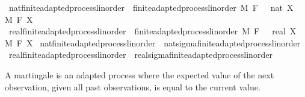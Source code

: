 \begin{isabellebody}
\isanewline
{}\isamarkupfalse%
\ nat{\isacharunderscore}{\kern0pt}finite{\isacharunderscore}{\kern0pt}adapted{\isacharunderscore}{\kern0pt}process{\isacharunderscore}{\kern0pt}linorder\ {\isacharequal}{\kern0pt}\ finite{\isacharunderscore}{\kern0pt}adapted{\isacharunderscore}{\kern0pt}process{\isacharunderscore}{\kern0pt}linorder\ M\ F\ {\isachardoublequoteopen}{}\ {\isacharcolon}{\kern0pt}{\isacharcolon}{\kern0pt}\ nat{\isachardoublequoteclose}\ X\ \ M\ F\ X\isanewline
{}\isamarkupfalse%
\ real{\isacharunderscore}{\kern0pt}finite{\isacharunderscore}{\kern0pt}adapted{\isacharunderscore}{\kern0pt}process{\isacharunderscore}{\kern0pt}linorder\ {\isacharequal}{\kern0pt}\ finite{\isacharunderscore}{\kern0pt}adapted{\isacharunderscore}{\kern0pt}process{\isacharunderscore}{\kern0pt}linorder\ M\ F\ {\isachardoublequoteopen}{}\ {\isacharcolon}{\kern0pt}{\isacharcolon}{\kern0pt}\ real{\isachardoublequoteclose}\ X\ \ M\ F\ X\isanewline
\isanewline
{}\isamarkupfalse%
\ nat{\isacharunderscore}{\kern0pt}finite{\isacharunderscore}{\kern0pt}adapted{\isacharunderscore}{\kern0pt}process{\isacharunderscore}{\kern0pt}linorder\ {\isasymsubseteq}\ nat{\isacharunderscore}{\kern0pt}sigma{\isacharunderscore}{\kern0pt}finite{\isacharunderscore}{\kern0pt}adapted{\isacharunderscore}{\kern0pt}process{\isacharunderscore}{\kern0pt}linorder%
\isadelimproof
\ %
\endisadelimproof
%
\isatagproof
\isacommand{{\isachardot}{\kern0pt}{\isachardot}{\kern0pt}}\isamarkupfalse%
%
\endisatagproof
{\isafoldproof}%
%
\isadelimproof
%
\endisadelimproof
\isanewline
{}\isamarkupfalse%
\ real{\isacharunderscore}{\kern0pt}finite{\isacharunderscore}{\kern0pt}adapted{\isacharunderscore}{\kern0pt}process{\isacharunderscore}{\kern0pt}linorder\ {\isasymsubseteq}\ real{\isacharunderscore}{\kern0pt}sigma{\isacharunderscore}{\kern0pt}finite{\isacharunderscore}{\kern0pt}adapted{\isacharunderscore}{\kern0pt}process{\isacharunderscore}{\kern0pt}linorder%
\isadelimproof
\ %
\endisadelimproof
%
\isatagproof
\isacommand{{\isachardot}{\kern0pt}{\isachardot}{\kern0pt}}\isamarkupfalse%
%
\endisatagproof
{\isafoldproof}%
%
\isadelimproof
%
\endisadelimproof
%
\isadelimdocument
%
\endisadelimdocument
%
\isatagdocument
%
\isamarkuptrue%
%
\endisatagdocument
{\isafolddocument}%
%
\isadelimdocument
%
\endisadelimdocument
%
\begin{isamarkuptext}%
A martingale is an adapted process where the expected value of the next observation, given all past observations, is equal to the current value.%

\end{isamarkuptext}
\end{isabellebody}
